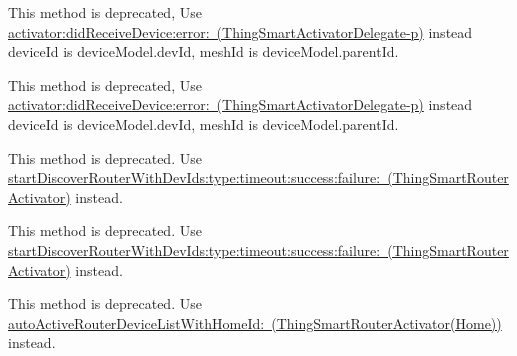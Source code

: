 
\begin{DoxyRefList}
\item[Member \mbox{\hyperlink{protocol_thing_smart_activator_delegate-p_a7e0ae06c5064785269d2a790aaa82a5c}{\mbox{[}Thing\+Smart\+Activator\+Delegate-\/p mesh\+Activator\+:did\+Receive\+Device\+Id\+:mesh\+Id\+:error\+:\mbox{]}}} ]\label{deprecated__deprecated000167}%
%
This method is deprecated, Use \mbox{\hyperlink{protocol_thing_smart_activator_delegate-p_ab6e5610356e667d863a518e944d82d52}{activator\+:did\+Receive\+Device\+:error\+: (\+Thing\+Smart\+Activator\+Delegate-\/p)}} instead {\ttfamily device\+Id} is {\ttfamily device\+Model.\+dev\+Id}, {\ttfamily mesh\+Id} is {\ttfamily device\+Model.\+parent\+Id}. 

\label{deprecated__deprecated000169}%
%
This method is deprecated, Use \mbox{\hyperlink{protocol_thing_smart_activator_delegate-p_ab6e5610356e667d863a518e944d82d52}{activator\+:did\+Receive\+Device\+:error\+: (\+Thing\+Smart\+Activator\+Delegate-\/p)}} instead {\ttfamily device\+Id} is {\ttfamily device\+Model.\+dev\+Id}, {\ttfamily mesh\+Id} is {\ttfamily device\+Model.\+parent\+Id}.  
\item[Member \mbox{\hyperlink{interface_thing_smart_auto_activator_a1b069c733bc2f9e189113349945268fb}{\mbox{[}Thing\+Smart\+Auto\+Activator start\+Discover\+Router\+With\+Dev\+Ids\+:type\+:timeout\+:success\+:failure\+:\mbox{]}}} ]\label{deprecated__deprecated000170}%
%
This method is deprecated. Use \mbox{\hyperlink{interface_thing_smart_router_activator_a1b132e8bbe03a605b4d211f81f993732}{start\+Discover\+Router\+With\+Dev\+Ids\+:type\+:timeout\+:success\+:failure\+: (\+Thing\+Smart\+Router\+Activator)}} instead. 

\label{deprecated__deprecated000168}%
%
This method is deprecated. Use \mbox{\hyperlink{interface_thing_smart_router_activator_a1b132e8bbe03a605b4d211f81f993732}{start\+Discover\+Router\+With\+Dev\+Ids\+:type\+:timeout\+:success\+:failure\+: (\+Thing\+Smart\+Router\+Activator)}} instead.  
\item[(Home) Member \mbox{\hyperlink{category_thing_smart_auto_activator_07_home_08_ad2dc9487c2fb95349035dc1d01db01b0}{\mbox{[}Thing\+Smart\+Auto\+Activator(Home) auto\+Active\+Router\+Device\+List\+With\+Home\+Id\+:\mbox{]}}} ]\label{deprecated__deprecated000089}%
%
This method is deprecated. Use \mbox{\hyperlink{category_thing_smart_router_activator_07_home_08_a912fa3f806b33e4f52ee04a5ac810273}{auto\+Active\+Router\+Device\+List\+With\+Home\+Id\+: (\+Thing\+Smart\+Router\+Activator(\+Home))}} instead. 


\end{DoxyRefList}
